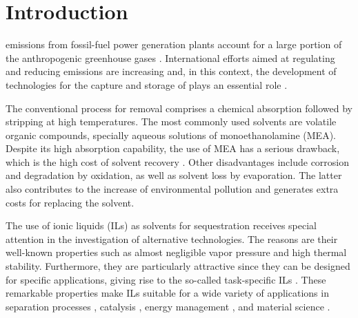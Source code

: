 \documentclass[3p,twocolumn]{elsarticle}
\begin{document}
\linenumbers

\section{Introduction}

 emissions from fossil-fuel power generation plants account for a large portion of the anthropogenic greenhouse gases \cite{totalenergy}.
International efforts aimed at regulating and reducing  emissions are increasing \cite{Tong_2018} and, in this context, the development of technologies for the capture and storage of  plays an essential role \cite{Markewitz_2014}.

The conventional process for  removal comprises a chemical absorption followed by stripping at high temperatures.
The most commonly used solvents are volatile organic compounds, specially aqueous solutions of monoethanolamine (MEA).
Despite its high absorption capability, the use of MEA has a serious drawback, which is the high cost of solvent recovery \cite{Merkel_2010}.
Other disadvantages include corrosion and degradation by oxidation, as well as solvent loss by evaporation.
The latter also contributes to the increase of environmental pollution and generates extra costs for replacing the solvent.

The use of ionic liquids (ILs) as solvents for  sequestration receives special attention in the investigation of alternative technologies.
The reasons are their well-known properties such as almost negligible vapor pressure and high thermal stability.
Furthermore, they are particularly attractive since they can be designed for specific applications, giving rise to the so-called task-specific ILs \cite{Seo_2014}.
These remarkable properties make ILs suitable for a wide variety of applications in separation processes \cite{Han_2010,Werner_2010}, catalysis \cite{P_rvulescu_2007}, energy management \cite{MacFarlane_2014}, and material science \cite{Mecerreyes_2011,Tom_2015,Dupont_2010,Leones_2017,Kinik_2017}.
\end{document}
